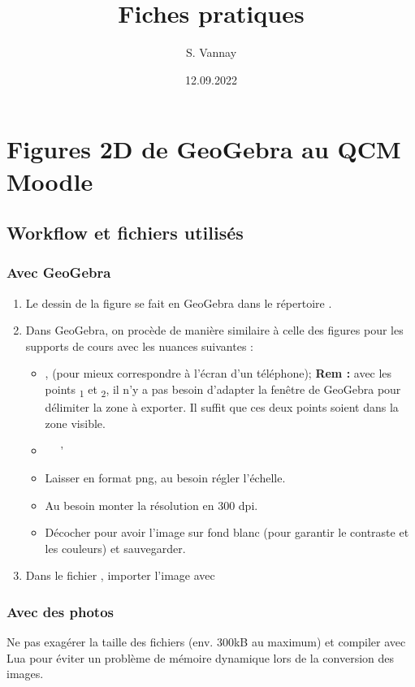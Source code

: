 \documentclass[10pt,a4paper]{report}
\title{Fiches pratiques}
\author{S. Vannay}
\date{12.09.2022}
\begin{document}
\chapterFormat
\chapter*{Figures 2D de GeoGebra au QCM Moodle}





\section*{Workflow et fichiers utilisés}



\subsection*{Avec GeoGebra}

\begin{enumerate}
	\item Le dessin de la figure se fait en GeoGebra dans le répertoire .
	\item Dans GeoGebra, on procède de manière similaire à celle des figures pour les supports de cours avec les nuances suivantes :
		\begin{itemize}
			\item {},  (pour mieux correspondre à l'écran d'un téléphone); \newline
				\textbf{Rem : } avec les points \textsubscript{1} et \textsubscript{2}, il n'y a pas besoin d'adapter la fenêtre  de GeoGebra pour délimiter la zone à exporter. Il suffit que ces deux points soient dans la zone visible.
			\item {} \textrightarrow \  \textrightarrow \ '
			\item Laisser en format png, au besoin régler l'échelle.
			\item Au besoin monter la résolution en 300 dpi.
			\item Décocher  pour avoir l'image sur fond blanc (pour garantir le contraste et les couleurs) et sauvegarder.
		\end{itemize}
	\item Dans le fichier , importer l'image avec
		\begin{center}
			\inlatex{\texttt{[image: ...]}}
		\end{center}
\end{enumerate}



\subsection*{Avec des photos}

Ne pas exagérer la taille des fichiers (env. 300kB au maximum) et compiler avec Lua pour éviter un problème de mémoire dynamique lors de la conversion des images.
\end{document}
